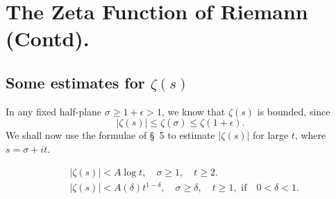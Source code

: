\chapter{The Zeta Function of Riemann (Contd).}\label{chap12}

\setcounter{section}{5}
\section[Some estimates for $\zeta(s)$]{Some estimates for {\boldmath$\zeta(s)$} \cite[p.27]{key11}}\label{chap12:sec6}\pageoriginale 

In any fixed half-plane $\sigma\geq 1 + \epsilon >1$, we know that
$\zeta(s)$ is bounded, since 
$$
|\zeta (s)| \leq \zeta(\sigma) \leq \zeta (1+ \epsilon).
$$
We shall now use the formulae of \S\ 5 to estimate $|\zeta(s)|$ for
large $t$, where $s = \sigma + it$.

\begin{theorem*}
\begin{align*}
& |\zeta(s)| < A \log t, \quad \sigma \geq 1, \quad t \geq 2. \\
& |\zeta(s)| < A (\delta) t^{1-\delta}, \quad \sigma \geq \delta,
  \quad t \geq 1, \text{ if~~ } 0 < \delta < 1.
\end{align*}
\end{theorem*}

